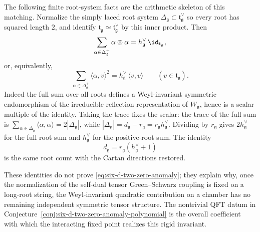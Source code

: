 The following finite root-system facts are the arithmetic skeleton of this
matching.  Normalize the simply laced root system
\(\Delta_{\mathfrak g}\subset\mathfrak t_{\mathfrak g}^\vee\) so every root
has squared length \(2\), and identify
\(\mathfrak t_{\mathfrak g}\simeq\mathfrak t_{\mathfrak g}^\vee\) by this
inner product.  Then
\begin{equation}
  \sum_{\alpha\in\Delta_{\mathfrak g}^+}
  \alpha\otimes\alpha
  =
  h^\vee_{\mathfrak g}\,\id_{\mathfrak t_{\mathfrak g}},
  \label{eq:six-d-positive-root-second-moment}
\end{equation}
or, equivalently,
\[
  \sum_{\alpha\in\Delta_{\mathfrak g}^+}
  \langle\alpha,v\rangle^2
  =
  h^\vee_{\mathfrak g}\,\langle v,v\rangle
  \qquad
  (v\in\mathfrak t_{\mathfrak g}).
\]
Indeed the full sum over all roots defines a Weyl-invariant symmetric
endomorphism of the irreducible reflection representation of \(W_{\mathfrak g}\),
hence is a scalar multiple of the identity.  Taking the trace fixes the
scalar: the trace of the full sum is
\(\sum_{\alpha\in\Delta_{\mathfrak g}}\langle\alpha,\alpha\rangle
=2|\Delta_{\mathfrak g}|\), while
\(|\Delta_{\mathfrak g}|=d_{\mathfrak g}-r_{\mathfrak g}
=r_{\mathfrak g}h^\vee_{\mathfrak g}\).  Dividing by
\(r_{\mathfrak g}\) gives \(2h^\vee_{\mathfrak g}\) for the full root sum
and \(h^\vee_{\mathfrak g}\) for the positive-root sum.  The identity
\begin{equation}
  d_{\mathfrak g}=r_{\mathfrak g}(h^\vee_{\mathfrak g}+1)
  \label{eq:six-d-dimension-rank-coxeter-relation}
\end{equation}
is the same root count with the Cartan directions restored.

These identities do not prove
\eqref{eq:six-d-two-zero-anomaly}; they explain why, once the normalization
of the self-dual tensor Green--Schwarz coupling is fixed on a long-root
string, the Weyl-invariant quadratic contribution on a chamber has no
remaining independent symmetric tensor structure.  The nontrivial QFT datum
in Conjecture~\ref{conj:six-d-two-zero-anomaly-polynomial} is the overall
coefficient with which the interacting fixed point realizes this rigid
invariant.

